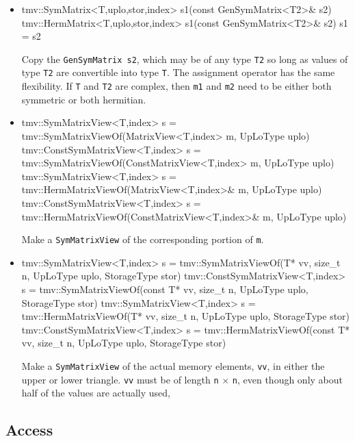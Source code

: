 \documentclass[twoside,letterpaper,11pt]{article}
\renewcommand{\tt}[1]{{\lstinline {#1}}}
\begin{document}
\begin{itemize}
\item
\begin{tmvcode}
tmv::SymMatrix<T,uplo,stor,index> s1(const GenSymMatrix<T2>& s2)
tmv::HermMatrix<T,uplo,stor,index> s1(const GenSymMatrix<T2>& s2)
s1 = s2
\end{tmvcode}
Copy the \tt{GenSymMatrix s2}, which may be of any type \tt{T2} so long
as values of type \tt{T2} are convertible into type \tt{T}.
The assignment operator has the same flexibility.
If \tt{T} and \tt{T2} are complex, then \tt{m1} and \tt{m2} need to be
either both symmetric or both hermitian.

\item
\begin{tmvcode}
tmv::SymMatrixView<T,index> s = 
      tmv::SymMatrixViewOf(MatrixView<T,index> m, UpLoType uplo)
tmv::ConstSymMatrixView<T,index> s = 
      tmv::SymMatrixViewOf(ConstMatrixView<T,index> m, UpLoType uplo)
tmv::SymMatrixView<T,index> s = 
      tmv::HermMatrixViewOf(MatrixView<T,index>& m, UpLoType uplo)
tmv::ConstSymMatrixView<T,index> s = 
      tmv::HermMatrixViewOf(ConstMatrixView<T,index>& m, UpLoType uplo)
\end{tmvcode}
Make a \tt{SymMatrixView} of the corresponding portion of \tt{m}.

\item
\begin{tmvcode}
tmv::SymMatrixView<T,index> s = 
      tmv::SymMatrixViewOf(T* vv, size_t n, UpLoType uplo, 
      StorageType stor)
tmv::ConstSymMatrixView<T,index> s =
      tmv::SymMatrixViewOf(const T* vv, size_t n, UpLoType uplo, 
      StorageType stor)
tmv::SymMatrixView<T,index> s =
      tmv::HermMatrixViewOf(T* vv, size_t n, UpLoType uplo, 
      StorageType stor)
tmv::ConstSymMatrixView<T,index> s =
      tmv::HermMatrixViewOf(const T* vv, size_t n, UpLoType uplo, 
      StorageType stor)
\end{tmvcode}
Make a \tt{SymMatrixView} of the actual memory elements, \tt{vv}, in either the 
upper or lower triangle.
\tt{vv} must be of length \tt{n} $\times$ \tt{n}, even though only about half 
of the values are actually used,

\end{itemize}

\subsection{Access}
\label{SymMatrix_Access}
\end{document}

